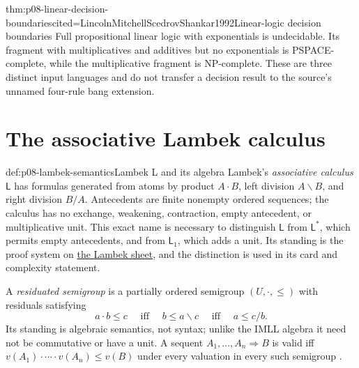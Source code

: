 \begin{hbtheorem}{thm:p08-linear-decision-boundaries}{cited=LincolnMitchellScedrovShankar1992}{Linear-logic decision boundaries}
Full propositional linear logic with exponentials is undecidable.  Its
fragment with multiplicatives and additives but no exponentials is
PSPACE-complete, while the multiplicative fragment is NP-complete.  These are
three distinct input languages and do not transfer a decision result to the
source's unnamed four-rule bang extension.
\end{hbtheorem}

\section{The associative Lambek calculus}
\label{sec:p08-lambek}

\begin{hbdefinition}{def:p08-lambek-semantics}{Lambek L and its algebra}
Lambek's \emph{associative calculus \(\mathsf L\)} has formulas
generated from atoms by product \(A\mathbin{\cdot}B\), left division
\(A\backslash B\), and right division \(B/A\).  Antecedents are finite
nonempty ordered sequences; the calculus has no exchange, weakening,
contraction, empty antecedent, or multiplicative unit.  This exact name is
necessary to distinguish \(\mathsf L\) from \(\mathsf L^*\), which permits
empty antecedents, and from \(\mathsf L_1\), which adds a unit.  Its standing
is the proof system on \hyperref[sheet:lambek-l]{the Lambek sheet}, and the
distinction is used in its card and complexity statement.

A \emph{residuated semigroup} is a partially ordered semigroup
\((U,\mathbin{\cdot},\leq)\) with residuals satisfying
\[
 a\mathbin{\cdot}b\leq c
 \quad\text{ iff }\quad
 b\leq a\backslash c
 \quad\text{ iff }\quad
 a\leq c/b.
\]
Its standing is algebraic semantics, not syntax; unlike the IMLL algebra it
need not be commutative or have a unit.  A sequent
\(A_1,\ldots,A_n\Rightarrow B\) is valid iff
\(v(A_1)\mathbin{\cdot}\cdots\mathbin{\cdot}v(A_n)\leq v(B)\) under every
valuation in every such semigroup \cite{Lambek1958,Buszkowski2010}.
\end{hbdefinition}

